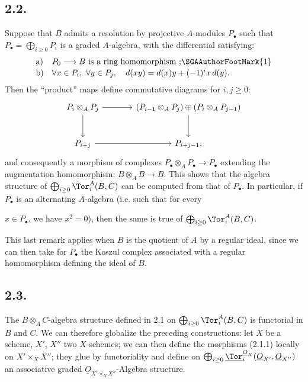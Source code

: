 \subsection*{2.2.}
Suppose that \(B\) admits a resolution by projective \(A\)-modules \(P_\bullet\) such that \(P_\bullet=\bigoplus_{i\ge0}P_i\) is a graded \(A\)-algebra, with the differential satisfying:
\[
\begin{array}{ll}
\text{a)}& P_0\longrightarrow B\text{ is a ring homomorphism~;}\SGAAuthorFootMark{1}\\[0.4ex]
\text{b)}& \forall x\in P_i,\ \forall y\in P_j,\quad d(xy)=d(x)y+(-1)^i x\,d(y).
\end{array}
\]
Then the ``product'' maps define commutative diagrams for \(i,j\ge0\):
\begin{equation}\notag
\begin{tikzcd}[column sep=large,row sep=large]
P_i\otimes_A P_j \arrow[r] \arrow[d] & (P_{i-1}\otimes_A P_j)\oplus(P_i\otimes_A P_{j-1}) \arrow[d]\\
P_{i+j} \arrow[r] & P_{i+j-1},
\end{tikzcd}
\end{equation}
and consequently a morphism of complexes \(P_\bullet\otimes_A P_\bullet\to P_\bullet\) extending the augmentation homomorphism: \(B\otimes_A B\to B\). This shows that the algebra structure of \(\bigoplus_{i\ge0}\Tor_i^A(B,C)\) can be computed from that of \(P_\bullet\). In particular, if \(P_\bullet\) is an alternating \(A\)-algebra (i.e. such that for every

%
\(x\in P_\bullet\), we have \(x^2=0\)), then the same is true of \(\bigoplus_{i\ge0}\Tor_i^A(B,C)\).

This last remark applies when \(B\) is the quotient of \(A\) by a regular ideal, since we can then take for \(P_\bullet\) the Koszul complex associated with a regular homomorphism defining the ideal of \(B\).

\subsection*{2.3.}
The \(B\otimes_A C\)-algebra structure defined in 2.1 on \(\bigoplus_{i\ge0}\Tor_i^A(B,C)\) is functorial in \(B\) and \(C\). We can therefore globalize the preceding constructions: let \(X\) be a scheme, \(X'\), \(X''\) two \(X\)-schemes; we can then define the morphisms (2.1.1) locally on \(X'\times_X X''\); they glue by functoriality and define on \(\bigoplus_{i\ge0}\underline{\Tor}_i^{\underline{O}_X}(\underline{O}_{X'},\underline{O}_{X''})\) an associative graded \(\underline{O}_{X'\times_X X''}\)-Algebra structure.

